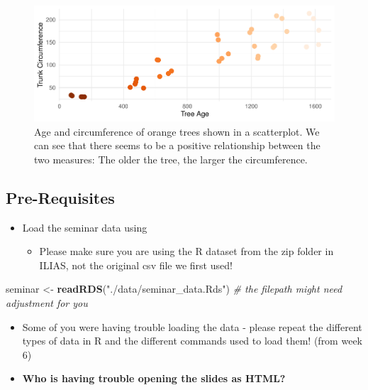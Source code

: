\documentclass[
]{book}
\newenvironment{Shaded}{\begin{snugshade}}{\end{snugshade}}
\newcommand{\CommentTok}[1]{\textcolor[rgb]{0.56,0.35,0.01}{\textit{#1}}}
\newcommand{\FunctionTok}[1]{\textcolor[rgb]{0.13,0.29,0.53}{\textbf{#1}}}
\newcommand{\NormalTok}[1]{#1}
\newcommand{\OtherTok}[1]{\textcolor[rgb]{0.56,0.35,0.01}{#1}}
\newcommand{\StringTok}[1]{\textcolor[rgb]{0.31,0.60,0.02}{#1}}
\providecommand{\tightlist}{%
  \setlength{\itemsep}{0pt}\setlength{\parskip}{0pt}}
\begin{document}
\begin{figure}
\centering
\includegraphics{_main_files/figure-html/tree-age-1.pdf}
\caption{\label{fig:tree-age}Age and circumference of orange trees shown in a scatterplot. We can see that there seems to be a positive relationship between the two measures: The older the tree, the larger the circumference.}
\end{figure}

\subsection{Pre-Requisites}\label{pre-requisites-1}

\begin{itemize}
\tightlist
\item
  Load the seminar data using

  \begin{itemize}
  \tightlist
  \item
    Please make sure you are using the R dataset from the
    zip folder in ILIAS, not the original csv file we first used!
  \end{itemize}
\end{itemize}

\begin{Shaded}
\begin{Highlighting}[]
\NormalTok{seminar }\OtherTok{\textless{}{-}} \FunctionTok{readRDS}\NormalTok{(}\StringTok{"./data/seminar\_data.Rds"}\NormalTok{) }\CommentTok{\# the filepath might need adjustment for you}
\end{Highlighting}
\end{Shaded}

\begin{itemize}
\tightlist
\item
  Some of you were having trouble loading the data - please repeat the different types of data in R and the different commands used to load them! (from week 6)
\item
  \textbf{Who is having trouble opening the slides as HTML?}
\end{itemize}
\end{document}
